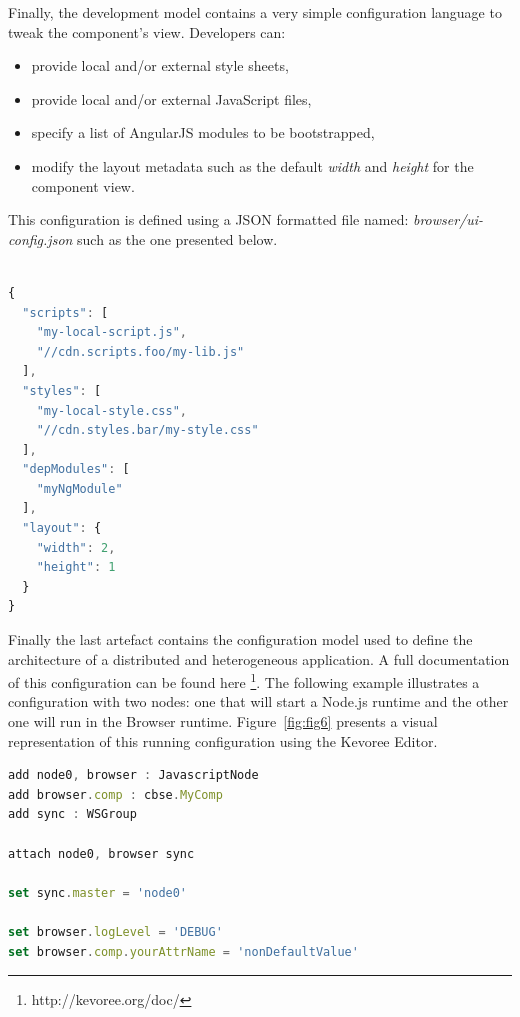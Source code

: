 Finally, the development model contains a very simple configuration language to tweak the component's view. Developers can:

\begin{itemize}
	\item provide local and/or external style sheets,
	\item provide local and/or external JavaScript files,
	\item specify a list of AngularJS modules to be bootstrapped,
	\item modify the layout metadata such as the default \emph{width} and \emph{height} for the component view.
\end{itemize}


This configuration is defined using a JSON formatted file named: \emph{browser/ui-config.json} such as the one presented below.

\begin{lstlisting}[language=JavaScript,numbers=right,firstnumber=1,basicstyle=\scriptsize,deletekeywords={port},frame=none,caption={Excerpt of the component configuration}]

{
  "scripts": [
    "my-local-script.js",
    "//cdn.scripts.foo/my-lib.js"
  ],
  "styles": [
    "my-local-style.css",
    "//cdn.styles.bar/my-style.css"
  ],
  "depModules": [
    "myNgModule"
  ],
  "layout": {
    "width": 2,
    "height": 1
  }
}
\end{lstlisting}

Finally the last artefact contains the configuration model used to define the architecture of a distributed and heterogeneous application. A full documentation of this configuration can be found here \footnote{http://kevoree.org/doc/}. The following example  illustrates a configuration with two nodes: one that will start a Node.js runtime  and the other one will run in the Browser runtime. Figure~\ref{fig:fig6} presents a visual representation of this running configuration using the Kevoree Editor.


\begin{lstlisting}[language=JavaScript,numbers=right,firstnumber=1,basicstyle=\scriptsize,morekeywords={add,attach,set,network},frame=none,caption={Excerpt of the application initial configuration}]
add node0, browser : JavascriptNode
add browser.comp : cbse.MyComp
add sync : WSGroup

attach node0, browser sync

set sync.master = 'node0'

set browser.logLevel = 'DEBUG'
set browser.comp.yourAttrName = 'nonDefaultValue'
\end{lstlisting}

